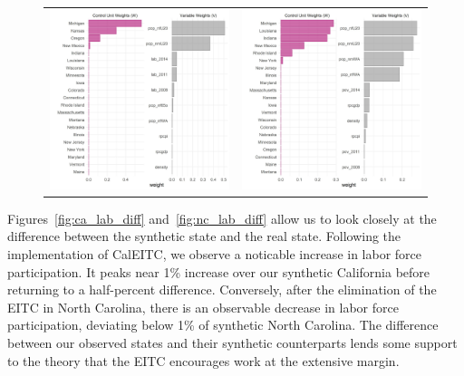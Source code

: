 \documentclass{article}
\begin{document}
\begin{figure}
\begin{center}
\begin{tabular}{cc}
 \includegraphics[width=80mm]{nc_lab_weights} &   \includegraphics[width=80mm]{nc_pov_weights} \\
\end{tabular}
\end{center}
\end{figure}

\restoregeometry

Figures~\ref{fig:ca_lab_diff} and~\ref{fig:nc_lab_diff} allow us to look closely at the difference between the synthetic state and the real state. Following the implementation of CalEITC, we observe a noticable increase in labor force participation. It peaks near 1\% increase over our synthetic California before returning to a half-percent difference. Conversely, after the elimination of the EITC in North Carolina, there is an observable decrease in labor force participation, deviating below 1\% of synthetic North Carolina. The difference between our observed states and their synthetic counterparts lends some support to the theory that the EITC encourages work at the extensive margin.
\end{document}
